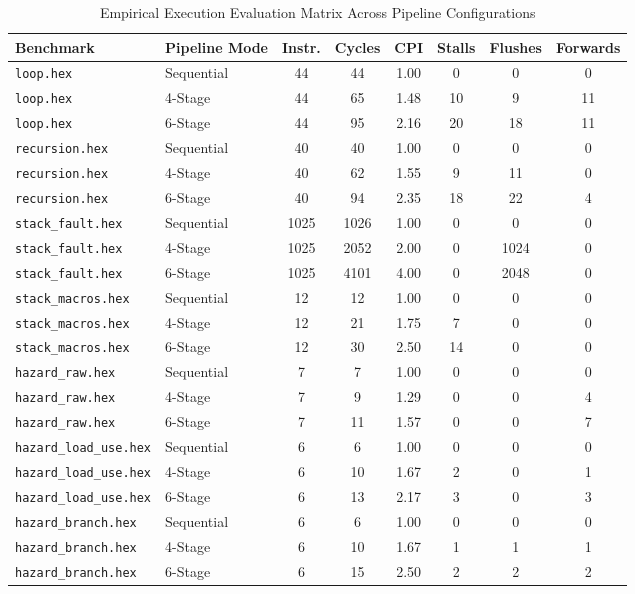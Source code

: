 \documentclass[11pt,a4paper]{article}
\begin{document}
\begin{table}[h]
\centering
\small
\caption{Empirical Execution Evaluation Matrix Across Pipeline Configurations}
\vspace{0.4em}
\begin{tabular*}{\textwidth}{@{\extracolsep{\fill}} l l c c c c c c}
\toprule
\textbf{Benchmark} & \textbf{Pipeline Mode} & \textbf{Instr.} & \textbf{Cycles} & \textbf{CPI} & \textbf{Stalls} & \textbf{Flushes} & \textbf{Forwards} \\
\midrule
\texttt{loop.hex}         & Sequential & 44   & 44   & 1.00 & 0  & 0    & 0  \\
\texttt{loop.hex}         & 4-Stage    & 44   & 65   & 1.48 & 10 & 9    & 11 \\
\texttt{loop.hex}         & 6-Stage    & 44   & 95   & 2.16 & 20 & 18   & 11 \\
\midrule
\texttt{recursion.hex}    & Sequential & 40   & 40   & 1.00 & 0  & 0    & 0  \\
\texttt{recursion.hex}    & 4-Stage    & 40   & 62   & 1.55 & 9  & 11   & 0  \\
\texttt{recursion.hex}    & 6-Stage    & 40   & 94   & 2.35 & 18 & 22   & 4  \\
\midrule
\texttt{stack\_fault.hex} & Sequential & 1025 & 1026 & 1.00 & 0  & 0    & 0  \\
\texttt{stack\_fault.hex} & 4-Stage    & 1025 & 2052 & 2.00 & 0  & 1024 & 0  \\
\texttt{stack\_fault.hex} & 6-Stage    & 1025 & 4101 & 4.00 & 0  & 2048 & 0  \\
\midrule
\texttt{stack\_macros.hex}& Sequential & 12   & 12   & 1.00 & 0  & 0    & 0  \\
\texttt{stack\_macros.hex}& 4-Stage    & 12   & 21   & 1.75 & 7  & 0    & 0  \\
\texttt{stack\_macros.hex}& 6-Stage    & 12   & 30   & 2.50 & 14 & 0    & 0  \\
\midrule
\texttt{hazard\_raw.hex}  & Sequential & 7    & 7    & 1.00 & 0  & 0    & 0  \\
\texttt{hazard\_raw.hex}  & 4-Stage    & 7    & 9    & 1.29 & 0  & 0    & 4  \\
\texttt{hazard\_raw.hex}  & 6-Stage    & 7    & 11   & 1.57 & 0  & 0    & 7  \\
\midrule
\texttt{hazard\_load\_use.hex}& Sequential & 6    & 6    & 1.00 & 0  & 0    & 0  \\
\texttt{hazard\_load\_use.hex}& 4-Stage    & 6    & 10   & 1.67 & 2  & 0    & 1  \\
\texttt{hazard\_load\_use.hex}& 6-Stage    & 6    & 13   & 2.17 & 3  & 0    & 3  \\
\midrule
\texttt{hazard\_branch.hex}   & Sequential & 6    & 6    & 1.00 & 0  & 0    & 0  \\
\texttt{hazard\_branch.hex}   & 4-Stage    & 6    & 10   & 1.67 & 1  & 1    & 1  \\
\texttt{hazard\_branch.hex}   & 6-Stage    & 6    & 15   & 2.50 & 2  & 2    & 2  \\
\bottomrule
\end{tabular*}
\end{table}
\end{document}
